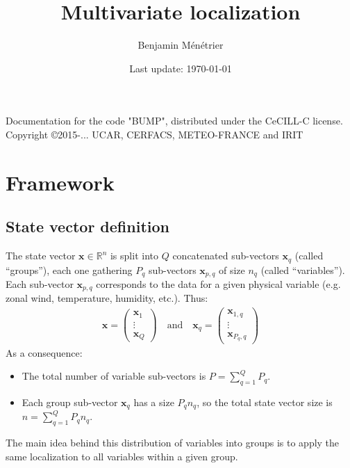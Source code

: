 \documentclass[12pt]{scrartcl}
\begin{document}
\title{Multivariate localization}
\author{Benjamin Ménétrier}
\date{Last update: \today}

\thispagestyle{empty}

\maketitle
\begin{center}
Documentation for the code "BUMP", distributed under the CeCILL-C license.\\
Copyright \copyright 2015-... UCAR, CERFACS, METEO-FRANCE and IRIT
\end{center}

\tableofcontents

\clearpage


\section{Framework}

\subsection{State vector definition}
The state vector $\mathbf{x} \in \mathbb{R}^n$ is split into $Q$ concatenated sub-vectors $\mathbf{x}_q$ (called ``groups''), each one gathering $P_q$ sub-vectors $\mathbf{x}_{p,q}$ of size $n_q$ (called ``variables''). Each sub-vector $\mathbf{x}_{p,q}$ corresponds to the data for a given physical variable (e.g. zonal wind, temperature, humidity, etc.). Thus:
\begin{align}
\mathbf{x} = \left( \begin{array}{c}
\mathbf{x}_1 \\[1ex]
\hline
\vdots \\
\hline
\mathbf{x}_Q
\end{array} \right) \quad \text{and} \quad \mathbf{x}_q = \left( \begin{array}{c}
\mathbf{x}_{1,q} \\[1ex]
\hline
\vdots \\
\hline
\mathbf{x}_{P_q,q}
\end{array} \right) 
\end{align}
As a consequence:
\begin{itemize}
\item The total number of variable sub-vectors is $\displaystyle P = \sum_{q=1}^Q P_q$.
\item Each group sub-vector $\mathbf{x}_q$ has a size $P_q n_q$, so the total state vector size is $n = \displaystyle \sum_{q=1}^Q P_q n_q$.
\end{itemize}
The main idea behind this distribution of variables into groups is to apply the same localization to all variables within a given group.\\
\end{document}

